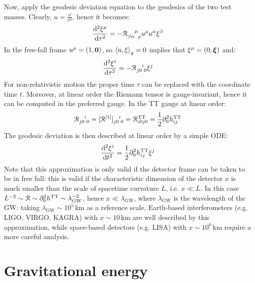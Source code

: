 Now, apply the geodesic deviation equation  to the geodesics of the two test masses. Clearly, $ u = \frac{\dd}{\dd \tau} $, hence it becomes:
\begin{equation*}
  \frac{\dd^2 \xi^\mu}{\dd \tau^2} = - \tensor{\rr}{_{\beta \alpha}^\mu_\rho} u^\rho u^\alpha \xi^\beta
\end{equation*}
In the free-fall frame $ u^\mu = (1 , \mathbf{0}) $, so $ \braket{u , \xi}_g = 0 $ implies that $ \xi^\mu = (0 , \boldsymbol{\xi}) $ and:
\begin{equation*}
  \frac{\dd^2 \xi^i}{\dd \tau^2} = - \tensor{\rr}{_{j0}^i_0} \xi^j
\end{equation*}
For non-relativistic motion the proper time $ \tau $ can be replaced with the coordinate time $ t $. Moreover, at linear order the Riemann tensor is gauge-invariant, hence it can be computed in the preferred gauge. In the TT gauge at linear order:
\begin{equation*}
  \tensor{\rr}{_{j0}^i_0} = \tensor{[\rr\od1]}{_{j0}^i_0} = \rr_{i0j0}^\text{TT} = \frac{1}{2} \pa_0^2 h_{ij}^\text{TT}
\end{equation*}
The geodesic deviation is then described at linear order by a simple ODE:
\begin{equation}
  \frac{\mathrm{d}^2 \xi^i}{\mathrm{d} t^2} = \frac{1}{2} \partial_0^2 h_{ij}^\text{TT} \xi^j
\end{equation}
Note that this approximation is only valid if the detector frame can be taken to be in free fall: this is valid if the characteristic dimension of the detector $ x $ is much smaller than the scale of spacetime curvature $ L $, i.e. $ x \ll L $. In this case $ L^{-2} \sim \EuScript{R} \sim \partial_0^2 h^\text{TT} \sim \lambda_\text{GW}^{-2} $, hence $ x \ll \lambda_\text{GW} $, where $ \lambda_\text{GW} $ is the wavelength of the GW: taking $ \lambda_\text{GW} \sim 10^5 \,\text{km} $ as a reference scale\footnotemark, Earth-based interferometers (e.g. LIGO, VIRGO, KAGRA) with $ x \sim 10 \,\text{km} $ are well described by this approximation, while space-based detectors (e.g. LISA) with $ x \sim 10^6 \,\text{km} $ require a more careful analysis.


\section{Gravitational energy}

